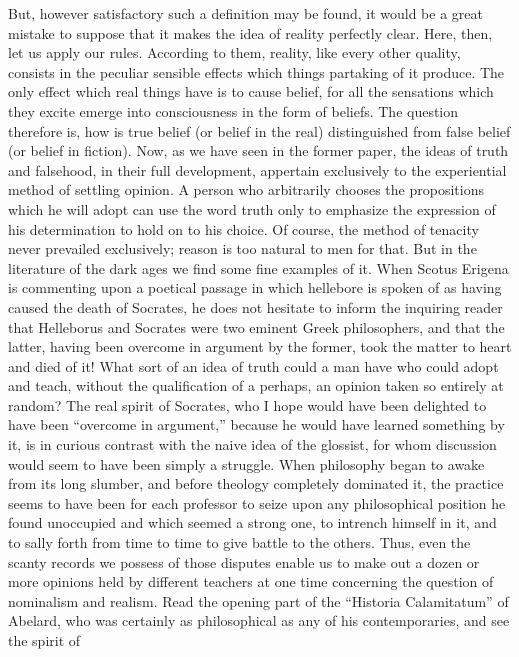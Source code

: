 \documentclass[]{article}
\begin{document}
But, however satisfactory such a definition may be found, it would be a great mistake to suppose that it makes the idea of reality perfectly clear. Here, then, let us apply our rules. According to them, reality, like every other quality, consists in the peculiar sensible effects which things partaking of it produce. The only effect which real things have is to cause belief, for all the sensations which they excite emerge into  consciousness in the form of beliefs. The question therefore is, how is true belief (or belief in the real) distinguished from false belief (or belief in fiction). Now, as we have seen in the former paper, the ideas of truth and falsehood, in their full development, appertain exclusively to the experiential method of settling opinion. A person who arbitrarily chooses the propositions which he will adopt can use the word truth only to emphasize the expression of his determination to hold on to his choice. Of course, the method of tenacity never prevailed exclusively; reason is too natural to men for that. But in the literature of the dark ages we find some fine examples of it. When Scotus Erigena is commenting upon a poetical passage in which hellebore is spoken of as having caused the death of Socrates, he does not
hesitate to inform the inquiring reader that Helleborus and Socrates were two eminent Greek philosophers, and that the latter, having been overcome in argument by the former, took the matter to heart and died of it! What sort of an idea of truth could a man have who could adopt and teach, without the qualification of a perhaps, an opinion taken so entirely at random? The real spirit of Socrates, who I hope would have been delighted to have been ``overcome in argument,'' because he would have learned something by it, is in curious contrast with the naive idea of the glossist, for whom discussion would seem to have been simply a struggle. When philosophy began to awake from its long slumber, and before theology completely dominated it, the practice seems to have been for each professor to seize upon any philosophical position he found unoccupied and which seemed a strong one, to intrench himself in it, and to sally forth from time to time to give battle to the others. Thus, even the scanty records we possess of those disputes enable us to make out a dozen or more opinions held by different teachers at one time concerning the question of nominalism and realism. Read the opening part of the ``Historia Calamitatum'' of Abelard, who was certainly as philosophical as any of his contemporaries, and see the spirit of
\end{document}
